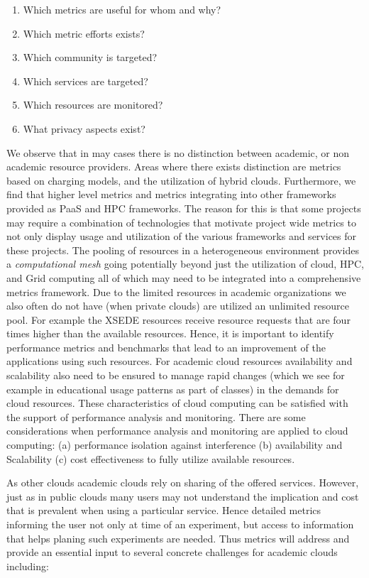 \documentclass{sig-alternate-05-2015}
\begin{document}
\begin{enumerate}
\setlength\itemsep{-2pt}
\item Which metrics are useful for whom and why?
\item Which metric efforts exists?
\item Which community is targeted?
\item Which services are targeted?
\item Which resources are monitored?
\item What privacy aspects exist? 
\end{enumerate}

We observe that in may cases there is no distinction between academic, or non academic resource providers. Areas where there exists distinction are metrics based on charging models, and the utilization of hybrid clouds. Furthermore, we find that higher level metrics and metrics integrating into other frameworks provided as PaaS and HPC frameworks. The reason for this is that some projects may require a combination of technologies that motivate project wide metrics to not only display usage and utilization of the various frameworks and services for these projects. The pooling of resources in a heterogeneous environment provides a {\it computational mesh} going potentially beyond just the utilization of cloud, HPC, and Grid computing all of which may need to be integrated into a comprehensive metrics framework. Due to the limited resources in academic organizations we also often do not have (when private clouds) are utilized an unlimited resource pool. For example the XSEDE resources receive resource requests that are four times higher than the available resources. Hence, it is important to identify performance metrics and benchmarks that lead to an improvement of the applications using such resources. For academic cloud resources availability and scalability also need to be ensured to manage rapid changes (which we see for example in educational usage patterns as part of classes) in the demands for cloud resources. These characteristics of cloud computing can be satisfied with the support of performance analysis and monitoring. There are some considerations when performance analysis and monitoring are applied to cloud computing: (a) performance isolation against interference (b) availability and Scalability (c) cost effectiveness to fully utilize available resources.


As other clouds academic clouds rely on sharing of the offered services. However, just as in public clouds many users may not understand the implication and cost that is prevalent when using a particular service. Hence detailed metrics informing the user not only at time of an experiment, but access to information that helps planing such experiments are needed. Thus metrics will address and provide an essential input to several concrete challenges for academic clouds including:
\end{document}
